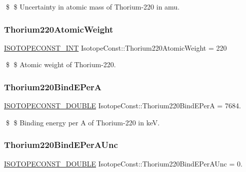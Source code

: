 \$ \$ Uncertainty in atomic mass of Thorium-\/220 in amu. \mbox{\label{group___isotope_const-_thorium-_th220_gafd8934df7269b6bb1ce643e87bf4a0ff}} 
\subsubsection{\texorpdfstring{Thorium220\+Atomic\+Weight}{Thorium220AtomicWeight}}
{\footnotesize\ttfamily \mbox{\hyperlink{group___isotope_const-_macros_ga5f18360b3e99483a35c32d789e62621c}{I\+S\+O\+T\+O\+P\+E\+C\+O\+N\+S\+T\+\_\+\+I\+NT}} Isotope\+Const\+::\+Thorium220\+Atomic\+Weight = 220}

\$ \$ Atomic weight of Thorium-\/220. \mbox{\label{group___isotope_const-_thorium-_th220_gaa04b7c9d9288a5f1bce9eb50e9abbdae}} 
\subsubsection{\texorpdfstring{Thorium220\+Bind\+E\+PerA}{Thorium220BindEPerA}}
{\footnotesize\ttfamily \mbox{\hyperlink{group___isotope_const-_macros_ga8f45a7272ce02c0b4c65c44636ed719a}{I\+S\+O\+T\+O\+P\+E\+C\+O\+N\+S\+T\+\_\+\+D\+O\+U\+B\+LE}} Isotope\+Const\+::\+Thorium220\+Bind\+E\+PerA = 7684.}

\$ \$ Binding energy per A of Thorium-\/220 in keV. \mbox{\label{group___isotope_const-_thorium-_th220_ga73d27f2f92894f2dc5ec62362e1a7419}} 
\subsubsection{\texorpdfstring{Thorium220\+Bind\+E\+Per\+A\+Unc}{Thorium220BindEPerAUnc}}
{\footnotesize\ttfamily \mbox{\hyperlink{group___isotope_const-_macros_ga8f45a7272ce02c0b4c65c44636ed719a}{I\+S\+O\+T\+O\+P\+E\+C\+O\+N\+S\+T\+\_\+\+D\+O\+U\+B\+LE}} Isotope\+Const\+::\+Thorium220\+Bind\+E\+Per\+A\+Unc = 0.}

